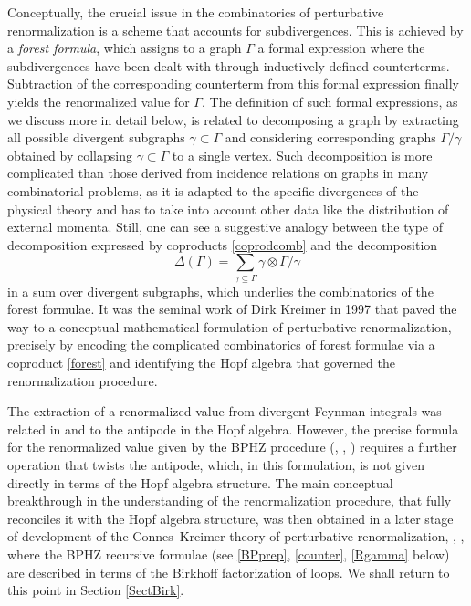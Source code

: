 \documentclass[10pt]{amsart}
\numberwithin{equation}{section}
\begin{document}
\smallskip

Conceptually, the crucial issue in the combinatorics of perturbative
renormalization is a scheme that accounts for subdivergences. This is
achieved by a {\em forest formula}, which assigns to a graph $\Gamma$
a formal expression where the subdivergences have been dealt with through
inductively defined counterterms.
Subtraction of the corresponding
counterterm from this formal expression finally yields the
renormalized value for $\Gamma$.
The definition of such formal
expressions, as we discuss more in detail below, is related to
decomposing a graph by extracting all possible divergent subgraphs
$\gamma\subset \Gamma$ and considering corresponding graphs
$\Gamma/\gamma$ obtained by collapsing $\gamma\subset \Gamma$ to a
single vertex. Such decomposition is more complicated than
those derived from incidence relations on graphs in many combinatorial
problems, as it is adapted to the specific divergences of the physical
theory and has to take into account other data like the distribution
of external momenta. Still, one can see a suggestive analogy between
the type of decomposition expressed by coproducts \eqref{coprodcomb} and the
decomposition
\begin{equation}\label{forest}
\Delta(\Gamma)= \sum_{\gamma \subseteq \Gamma} \gamma \otimes \Gamma/\gamma
\end{equation}
in a sum over divergent subgraphs, which underlies the
combinatorics of the forest formulae.
It was the seminal work of Dirk Kreimer \cite{DK1} in 1997 that
paved the way to a conceptual mathematical
formulation of perturbative renormalization, precisely by encoding the
complicated combinatorics of forest formulae via a coproduct
\eqref{forest} and identifying the Hopf algebra that governed the
renormalization procedure.

\smallskip

The extraction of a renormalized value from divergent Feynman
integrals was related in \cite{DK1} and \cite{CK3} to the antipode
in the Hopf algebra. However, the precise formula for the
renormalized value given by the BPHZ procedure (\cite{BP},
\cite{Hepp}, \cite{Zi}) requires a further operation that twists
the antipode, which, in this formulation, is not given directly in
terms of the Hopf algebra structure. The main conceptual
breakthrough in the understanding of the renormalization procedure,
that fully reconciles it with the Hopf algebra structure,
was then obtained in a later stage of development of the
Connes--Kreimer theory of perturbative renormalization,
\cite{CK1}, \cite{CK2}, where the BPHZ recursive formulae (see
\eqref{BPprep}, \eqref{counter}, \eqref{Rgamma} below) are
described in terms of the Birkhoff factorization of loops. We
shall return to this point in Section \ref{SectBirk}.
\end{document}
